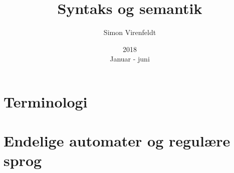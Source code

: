 \documentclass[10pt,a4paper,oneside]{article}
\author{Simon Virenfeldt}
\title{Syntaks og semantik}
\date{2018\\Januar - juni}
\begin{document}
    \maketitle
    
    \section{Terminologi}
    
    \section{Endelige automater og regulære sprog}
    
\end{document}
